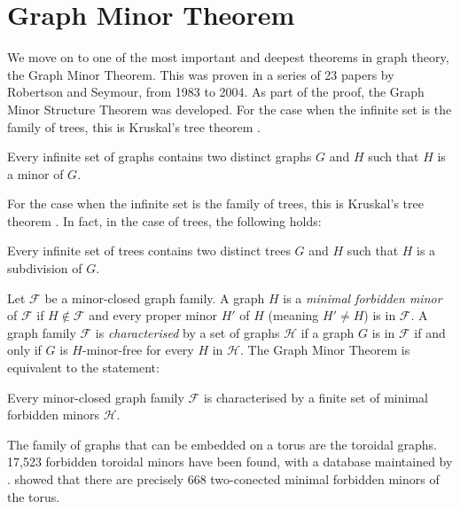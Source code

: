 \section{Graph Minor Theorem}\label{sec:Graph Minor Theorem}
We move on to one of the most important and deepest theorems in graph theory, the Graph Minor Theorem. This was proven in a series of 23 papers by Robertson and Seymour, from 1983 to 2004. As part of the proof, the Graph Minor Structure Theorem was developed. For the case when the infinite set is the family of trees, this is Kruskal's tree theorem \cite{kruskalWellQuasiOrderingTreeTheorem1960}. 
\begin{theorem}
	Every infinite set of graphs contains two distinct graphs \(G\) and \(H\) such that \(H\) is a minor of \(G\).
\end{theorem}
For the case when the infinite set is the family of trees, this is Kruskal's tree theorem \cite{kruskalWellQuasiOrderingTreeTheorem1960}. In fact, in the case of trees, the following holds:
\begin{theorem}
	Every infinite set of trees contains two distinct trees \(G\) and \(H\) such that \(H\) is a subdivision of \(G\).
\end{theorem}
Let $\mathcal{F}$ be a minor-closed graph family. A graph $H$ is a \textit{minimal forbidden minor} of $\mathcal{F}$ if $H \notin \mathcal{F}$ and every proper minor $H'$ of $H$ (meaning $H' \neq H$) is in $\mathcal{F}$. A graph family $\mathcal{F}$ is \textit{characterised} by a set of graphs $\mathcal{H}$ if a graph $G$ is in $\mathcal{F}$ if and only if $G$ is $H$-minor-free for every $H$ in $\mathcal{H}$. 
The Graph Minor Theorem is equivalent to the statement:
\begin{theorem}
	Every minor-closed graph family $\mathcal{F}$ is characterised by a finite set of minimal forbidden minors $\mathcal{H}$. 
\end{theorem}

The family of graphs that can be embedded on a torus are the toroidal graphs. 17,523 forbidden toroidal minors have been found, with a database maintained by \textcite{myrvoldLargeSetTorus2018}. \textcite{moharExcludedMinorsKlein2024} showed that there are precisely $668$ two-conected minimal forbidden minors of the torus.

